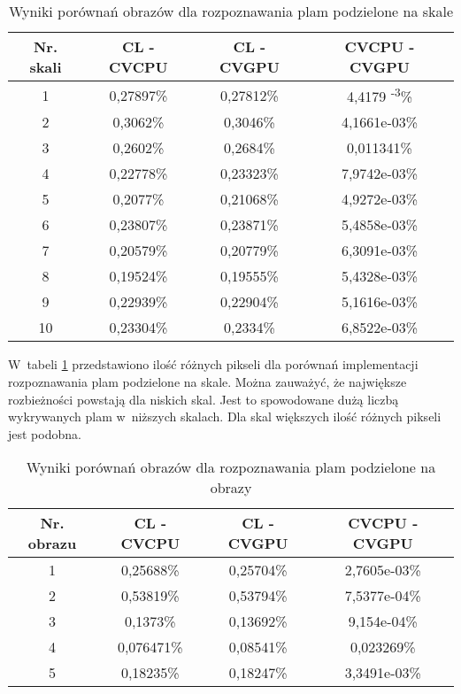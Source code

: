 \begin{center}
\begin{table}
\centering
\caption{Wyniki porównań obrazów dla rozpoznawania plam podzielone na skale}
\label{tab:imageScaleBlob}
\begin{tabular}{|c|c|c|c|}
 \hline
Nr. skali & CL - CVCPU & CL - CVGPU & CVCPU - CVGPU \\ \hline
1 & 0,27897\% & 0,27812\% & 4,4179 \textperiodcentered 10 \textsuperscript{-3}\% \\ \hline
2 & 0,3062\% & 0,3046\% & 4,1661e-03\% \\ \hline
3 & 0,2602\% & 0,2684\% & 0,011341\% \\ \hline
4 & 0,22778\% & 0,23323\% & 7,9742e-03\% \\ \hline
5 & 0,2077\% & 0,21068\% & 4,9272e-03\% \\ \hline
6 & 0,23807\% & 0,23871\% & 5,4858e-03\% \\ \hline
7 & 0,20579\% & 0,20779\% & 6,3091e-03\% \\ \hline
8 & 0,19524\% & 0,19555\% & 5,4328e-03\% \\ \hline
9 & 0,22939\% & 0,22904\% & 5,1616e-03\% \\ \hline
10 & 0,23304\% & 0,2334\% & 6,8522e-03\% \\ \hline
\end{tabular}
\end{table}
\end{center}

W~tabeli \ref{tab:imageScaleBlob} przedstawiono ilość różnych pikseli dla porównań implementacji rozpoznawania plam podzielone na skale. Można zauważyć, że największe rozbieżności powstają dla niskich skal. Jest to spowodowane dużą liczbą wykrywanych plam w~niższych skalach. Dla skal większych ilość różnych pikseli jest podobna. 

\begin{center}
\begin{table}
\centering
\caption{Wyniki porównań obrazów dla rozpoznawania plam podzielone na obrazy}
\label{tab:imageImageBlob}
\begin{tabular}{|c|c|c|c|}
\hline
Nr. obrazu & CL - CVCPU & CL - CVGPU & CVCPU - CVGPU \\ \hline
1 & 0,25688\% & 0,25704\% & 2,7605e-03\% \\ \hline
2 & 0,53819\% & 0,53794\% & 7,5377e-04\% \\ \hline
3 & 0,1373\% & 0,13692\% & 9,154e-04\% \\ \hline
4 & 0,076471\% & 0,08541\% & 0,023269\% \\ \hline
5 & 0,18235\% & 0,18247\% & 3,3491e-03\% \\ \hline
\end{tabular}
\end{table}
\end{center}

